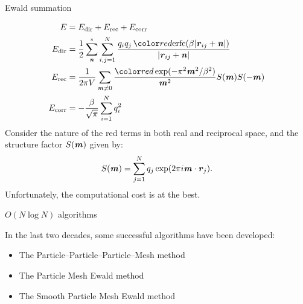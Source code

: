 \documentclass[final,hyperref={pdfpagelabels=false}]{beamer}
\begin{document}
\begin{frame}{}
\begin{columns}[t]
\begin{column}{.32\linewidth}
\begin{block}{\large Ewald summation}
\begin{minipage}[c]{.975\linewidth}
\begin{align*}
            E &=  E_{\textrm{dir}} +E_{\textrm{rec}}+E_{\textrm{corr}}\\
            E_{\textrm{dir}} & = \frac12 \sum^{\ast}_{\v n}
            \sum_{i,j = 1}^{N} \frac{q_iq_j\, \redc{\textrm{erfc}(\beta \vert\v{r}_{ij} + \v{n}\vert)}}
            {\vert\v{r}_{ij} + \v{n}\vert} \\ \label{Erec-ewald}
            E_{\textrm{rec}} & = \frac1{2\pi V} \sum_{\v m \neq 0}
            \frac{\redc{\exp(-\pi^2\v m^2 / \beta^2)}}{\v m^2} S(\v m) S(-\v m) \\
            E_{\textrm{corr}}& = -\frac\beta{\sqrt \pi} \sum_{i=1}^N q_i^2
          \end {align*}
          Consider the  nature of the red terms in both real and
          reciprocal space, and the structure factor $S(\textbf{\textit{m}})$ given by:
          \begin{equation*}
            S(\textbf{\textit{m}}) = \sum_{j=1}^N q_j \exp (2 \pi i \textbf{\textit{m}} \cdot \textbf{\textit{r}}_j).
          \end{equation*}
          Unfortunately, the computational cost is 
          at the best.          
        \end{minipage}
        \end{block}
        \vfill
        \begin{block}{\large $O(N \log N)$ algorithms}
          \vspace{1ex}
          \begin{minipage}[c]{.975\linewidth}
          In the last two decades, some successful algorithms have
          been developed: 
          \begin{itemize}
          \item The \redc Particle--\redc Particle--\redc Particle--\redc Mesh method
          \item The \redc Particle \redc Mesh \redc Ewald method 
          \item The \redc Smooth \redc Particle \redc Mesh \redc Ewald method 
          \end{itemize}


\end{minipage}
\end{block}
\end{column}
\end{columns}
\end{frame}
\end{document}
